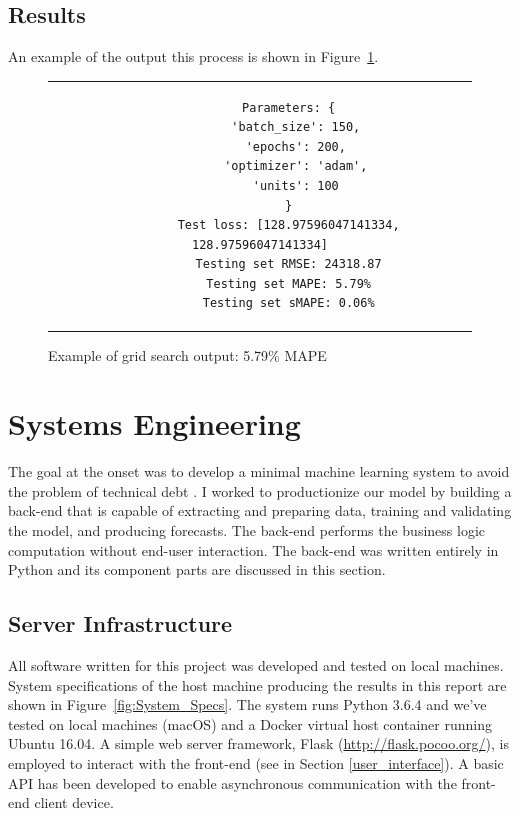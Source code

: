 \documentclass[11pt, oneside]{article}
\begin{document}
\subsection{Results}
An example of the output this process is shown in Figure~\ref{fig:Example_Output}.

\begin{figure}[h]
  \caption{Example of grid search output: 5.79\% MAPE}
  \label{fig:Example_Output}
  \begin{center}
    \begin{tabular}{c}
      \begin{lstlisting}
        Parameters: {
          'batch_size': 150,
          'epochs': 200,
          'optimizer': 'adam',
          'units': 100
        }
        Test loss: [128.97596047141334, 128.97596047141334]
        Testing set RMSE: 24318.87
        Testing set MAPE: 5.79%
        Testing set sMAPE: 0.06%
      \end{lstlisting}
    \end{tabular}
  \end{center}
\end{figure}

\section{Systems Engineering}
The goal at the onset was to develop a minimal machine learning system to avoid the problem of technical debt \cite{sculley et al.}. I worked to productionize our model by building a back-end that is capable of extracting and preparing data, training and validating the model, and producing forecasts. The back-end performs the business logic computation without end-user interaction. The back-end was written entirely in Python and its component parts are discussed in this section.

\subsection{Server Infrastructure}
All software written for this project was developed and tested on local machines. System specifications of the host machine producing the results in this report are shown in Figure~\ref{fig:System_Specs}. The system runs Python 3.6.4 and we've tested on local machines (macOS) and a Docker virtual host container running Ubuntu 16.04. A simple web server framework, Flask (\url{http://flask.pocoo.org/}), is employed to interact with the front-end (see in Section \ref{user_interface}). A basic API has been developed to enable asynchronous communication with the front-end client device.
\end{document}

